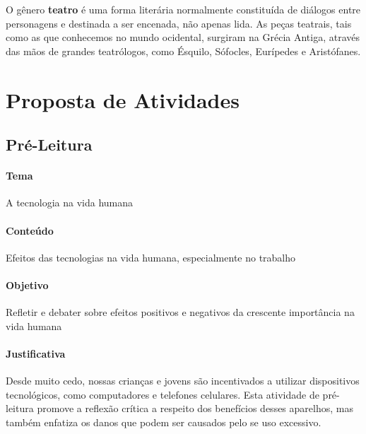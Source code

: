 \documentclass[11pt]{extarticle}
\begin{document}
O gênero \textbf{teatro} é uma forma literária normalmente constituída de diálogos entre personagens e destinada a ser encenada, não apenas lida. As peças teatrais, tais como as que conhecemos no mundo ocidental, surgiram na Grécia Antiga, através das mãos de grandes teatrólogos, como Ésquilo, Sófocles, Eurípedes e Aristófanes.

\section{Proposta de Atividades}
\subsection{Pré-Leitura}


\paragraph{Tema} A tecnologia na vida humana

\paragraph{Conteúdo} Efeitos das tecnologias na vida humana, especialmente no trabalho 

\paragraph{Objetivo} Refletir e debater sobre efeitos positivos e negativos da crescente importância na vida humana 

\paragraph{Justificativa} Desde muito cedo, nossas crianças e jovens são incentivados a utilizar dispositivos tecnológicos, como computadores e telefones celulares. Esta atividade de pré-leitura promove a reflexão crítica a respeito dos benefícios desses aparelhos, mas também enfatiza os danos que podem ser causados pelo se uso excessivo.  
\end{document}
